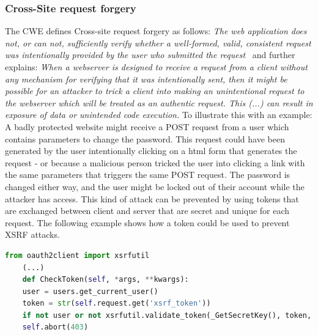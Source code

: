 \documentclass[
a4paper,
pagesize,
pdftex,
12pt,
twoside, %
BCOR=5mm, %
ngerman,
fleqn,
final,
]{scrartcl}
\begin{document}
	\subsubsection{Cross-Site request forgery}
	The CWE defines Cross-site request forgery as follows: \textit{The web application does not, or can not, sufficiently verify whether a well-formed, valid, consistent request was intentionally provided by the user who submitted the request}~\cite{CommonWeaknessEnumeration.19.9.2019b} and further explains: \textit{When a webserver is designed to receive a request from a client without any mechanism for verifying that it was intentionally sent, then it might be possible for an attacker to trick a client into making an unintentional request to the webserver which will be treated as an authentic request. This (...) can result in exposure of data or unintended code execution.} To illustrate this with an example: A badly protected website might receive a POST request from a user which contains parameters to change the password. This request could have been generated by the user intentionally clicking on a html form that generates the request - or because a malicious person tricked the user into clicking a link with the same parameters that triggers the same POST request. The password is changed either way, and the user might be locked out of their account while the attacker has access. This kind of attack can be prevented by using tokens that are exchanged between client and server that are secret and unique for each request. The following example shows how a token could be used to prevent XSRF attacks.
	\begin{lstlisting}[language=Python, showstringspaces=False]
	from oauth2client import xsrfutil
	(...)
	def CheckToken(self, *args, **kwargs):
	user = users.get_current_user()
	token = str(self.request.get('xsrf_token'))
	if not user or not xsrfutil.validate_token(_GetSecretKey(), token, user.user_id()):
	self.abort(403)
	
	\end{lstlisting}
	
\end{document}
